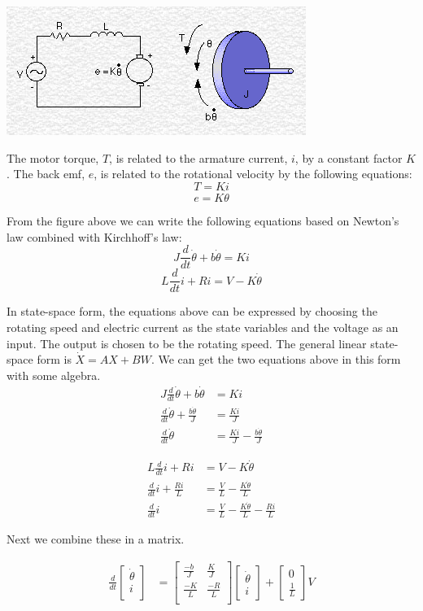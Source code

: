 \documentclass{article}
\begin{document}
\includegraphics[scale=0.5]{./dc_motor_model.png}

The motor torque, $T$, is related to the armature current, $i$, by a constant factor $K$. The back emf, $e$, is related to the rotational velocity by the following equations:
$$T=Ki$$
$$e=K\dot{\theta}$$

From the figure above we can write the following equations based on Newton's law combined with Kirchhoff's law:
$$J\frac{d}{dt}\dot{\theta} + b\dot{\theta} = Ki$$
$$L\frac{d}{dt}i+Ri=V-K\dot{\theta}$$

In state-space form, the equations above can be expressed by choosing the rotating speed and electric current as the state variables and the voltage as an input. The output is chosen to be the rotating speed. The general linear state-space form is $\dot{X} = AX + BW$. We can get the two equations above in this form with some algebra.
\begin{align}
  J\frac{d}{dt}\dot{\theta} + b\dot{\theta} &= Ki \\
  \frac{d}{dt}\dot{\theta} + \frac{b\dot{\theta}}{J} &= \frac{Ki}{J} \\
  \frac{d}{dt}\dot{\theta} &= \frac{Ki}{J} - \frac{b\dot{\theta}}{J}
\end{align}

\begin{align}
  L\frac{d}{dt}i + Ri &= V - K\dot{\theta} \\
  \frac{d}{dt}i + \frac{Ri}{L} &= \frac{V}{L} - \frac{K\dot{\theta}}{L} \\
  \frac{d}{dt}i &= \frac{V}{L} - \frac{K\dot{\theta}}{L} - \frac{Ri}{L}
\end{align}

Next we combine these in a matrix.

\begin{align}
  \frac{d}{dt}\begin{bmatrix}\dot{\theta}\\i\\\end{bmatrix} &=
    \begin{bmatrix}
      \frac{-b}{J} & \frac{K}{J} \\
      \frac{-K}{L} & \frac{-R}{L} \\
    \end{bmatrix}
    \begin{bmatrix}
      \dot{\theta} \\
      i
    \end{bmatrix}
    +
    \begin{bmatrix}
      0 \\
      \frac{1}{L}
    \end{bmatrix}
    V
\end{align}
\end{document}
